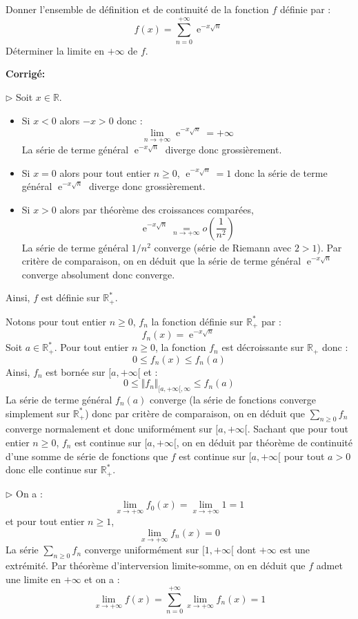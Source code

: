 \documentclass[a4paper,twoside,french,11pt]{VcCours}
\DeclareMathOperator{\e}{e}
\newcommand{\Sum}[2]{\sum_{#1}^{#2}}
\newcommand{\corr}{\textbf{Corrigé:}}
\begin{document}
\begin{Exercice}{} Donner l'ensemble de définition et de continuité de la fonction $f$ définie par :
  \[
  f(x) = \sum_{n = 0}^{ + \infty} \e^{ - x\sqrt n}
  \]
 Déterminer la limite en $ + \infty$ de $f$.
 \end{Exercice}
 
 \corr 

$\rhd$ Soit $x \in \mathbb{R}$.
\begin{itemize}
\item Si $x<0$ alors $-x>0$ donc :
$$ \lim_{n \rightarrow + \infty} \e^{ - x\sqrt n} = + \infty$$
La série de terme général $\e^{ - x\sqrt n}$ diverge donc grossièrement.
\item Si $x=0$ alors pour tout entier $n \geq 0$, $\e^{ - x\sqrt n}=1$ donc la série de terme général $\e^{ - x\sqrt n}$ diverge donc grossièrement.
\item Si $x>0$ alors par théorème des croissances comparées,
$$ \e^{ - x\sqrt n}  \underset{n \rightarrow + \infty}{=} o \left( \dfrac{1}{n^2} \right)$$
La série de terme général $1/n^2$ converge (série de Riemann avec $2>1$). Par critère de comparaison, on en déduit que la série de terme général $ \e^{ - x\sqrt n} $ converge absolument donc converge.
\end{itemize}
Ainsi, $f$ est définie sur $\mathbb{R}_+^*$.

\bigskip

Notons pour tout entier $n \geq 0$, $f_n$ la fonction définie sur $\mathbb{R}_+^*$ par :
$$f_n(x)= \e^{ - x\sqrt n}$$
Soit $a \in \mathbb{R}_+^*$. Pour tout entier $n \geq 0$, la fonction $f_n$ est décroissante sur $\mathbb{R}_+$ donc :
$$ 0 \leq f_n(x) \leq f_n(a)$$
Ainsi, $f_n$ est bornée sur $[a, + \infty[$ et :
$$ 0 \leq \Vert f_n \Vert_{[a, + \infty[, \infty} \leq f_n(a)$$
La série de terme général $f_n(a)$ converge (la série de fonctions converge simplement sur $\mathbb{R}_+^*$) donc par critère de comparaison, on en déduit que $\Sum{n\geq 0}{} f_n$ converge normalement et donc uniformément sur $[a, + \infty[$. Sachant que pour tout entier $n \geq 0$, $f_n$ est continue sur $[a, + \infty[$, on en déduit par théorème de continuité d'une somme de série de fonctions que $f$ est continue sur $[a, + \infty[$ pour tout $a>0$ donc elle continue sur $\mathbb{R}_+^*$.

\medskip

$\rhd$ On a :
$$ \lim_{x \rightarrow + \infty} f_0(x) = \lim_{x \rightarrow + \infty} 1 = 1$$
et pour tout entier $n \geq 1$,
$$ \lim_{x \rightarrow + \infty} f_n(x) = 0$$
La série $\Sum{n\geq 0}{} f_n$ converge uniformément sur $[1, + \infty[$ dont $+ \infty$ est une extrémité. Par théorème d'interversion limite-somme, on en déduit que $f$ admet une limite en $+ \infty$ et on a :
$$ \lim_{x \rightarrow + \infty} f(x) = \sum_{n=0}^{+ \infty} \lim_{x \rightarrow + \infty} f_n(x) = 1$$
\end{document}

